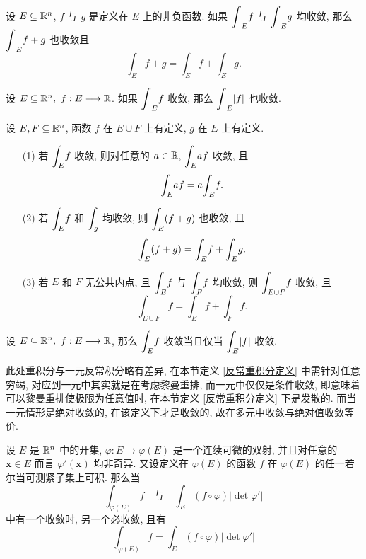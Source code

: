 \begin{lemma}
	设 $E\subseteq \R^n$, $f$ 与 $g$ 是定义在 $E$ 上的非负函数. 如果 $\dps \int_E f$ 与 $\dps\int_E g$ 均收敛, 那么 $\dps\int_E f+g$ 也收敛且 $$\int_E f+g = \int_E f+\int_E g.$$
\end{lemma}

\begin{proposition}
	设 $E\subseteq \R^n,\ f:E\longrightarrow\R$. 如果 $\dps\int_E f$ 收敛, 那么 $\dps\int_E |f|$ 也收敛.
\end{proposition}

\begin{proposition}
	设 $E,F\subseteq\R^n$, 函数 $f$ 在 $E\cup F$ 上有定义, $g$ 在 $E$ 上有定义.
	
	\begin{itemize}[leftmargin=1.5cm]
		\item[(1)] 若 $\mint[E]f$ 收敛, 则对任意的 $a\in\R$, $\mint[E] af$ 收敛, 且 $$\mint[E] af=a\mint[E] f.$$
		\item[(2)] 若 $\mint[E] f$ 和 $\mint[g]$ 均收敛, 则 $\mint[E](f+g)$ 也收敛, 且 $$\mint[E](f+g)=\mint[E] f+\mint[E] g.$$
		\item[(3)] 若 $E$ 和 $F$ 无公共内点, 且 $\mint[E] f$ 与 $\mint[F] f$ 均收敛, 则 $\mint[E\cup F] f$ 收敛, 且 $$\int_{E\cup F} f = \int_E f+\int_F f.$$
	\end{itemize}
\end{proposition}

\begin{theorem}
	设 $E\subseteq \R^n,\ f:E\longrightarrow\R$, 那么 $\mint[E] f$ 收敛当且仅当 $\mint[E] |f|$ 收敛. 
\end{theorem}

\begin{remark}
	此处重积分与一元反常积分略有差异, 在本节定义 \ref{反常重积分定义} 中需针对任意穷竭, 对应到一元中其实就是在考虑黎曼重排, 而一元中仅仅是条件收敛, 即意味着可以黎曼重排使极限为任意值时, 在本节定义 \ref{反常重积分定义} 下是发散的. 而当一元情形是绝对收敛的, 在该定义下才是收敛的, 故在多元中收敛与绝对值收敛等价. 
\end{remark}

\begin{theorem}
	设 $E$ 是 $\R^n$ 中的开集, $\varphi:E\longrightarrow\varphi(E)$ 是一个连续可微的双射, 并且对任意的 $\bm x \in E$ 而言 $\varphi'(\bm x)$ 均非奇异. 又设定义在 $\varphi(E)$ 的函数 $f$ 在 $\varphi(E)$ 的任一若尔当可测紧子集上可积. 那么当 $$\int_{\varphi(E)} f\quad\text{与}\quad\int_{E}(f\circ \varphi)|\det \varphi'|$$ 中有一个收敛时, 另一个必收敛, 且有 $$\int_{\varphi(E)} f=\int_{E}(f\circ \varphi)|\det \varphi'|$$
\end{theorem}


